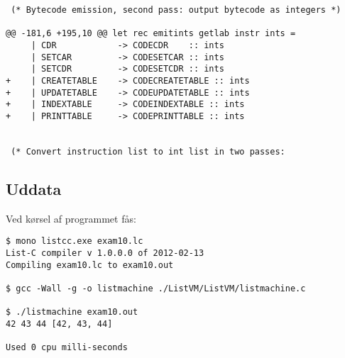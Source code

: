 \begin{verbatim}
 (* Bytecode emission, second pass: output bytecode as integers *)
 
@@ -181,6 +195,10 @@ let rec emitints getlab instr ints =
     | CDR            -> CODECDR    :: ints
     | SETCAR         -> CODESETCAR :: ints
     | SETCDR         -> CODESETCDR :: ints
+    | CREATETABLE    -> CODECREATETABLE :: ints
+    | UPDATETABLE    -> CODEUPDATETABLE :: ints
+    | INDEXTABLE     -> CODEINDEXTABLE :: ints
+    | PRINTTABLE     -> CODEPRINTTABLE :: ints
 
 
 (* Convert instruction list to int list in two passes:
\end{verbatim}

\subsection{Uddata}

Ved kørsel af programmet fås:

\begin{verbatim}
$ mono listcc.exe exam10.lc
List-C compiler v 1.0.0.0 of 2012-02-13
Compiling exam10.lc to exam10.out

$ gcc -Wall -g -o listmachine ./ListVM/ListVM/listmachine.c

$ ./listmachine exam10.out
42 43 44 [42, 43, 44]

Used 0 cpu milli-seconds
\end{verbatim}
